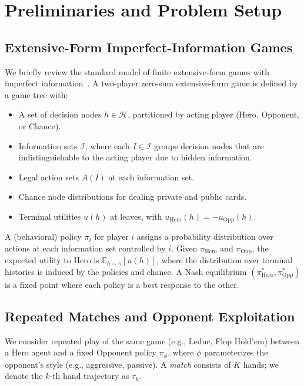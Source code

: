 \documentclass{article}
\begin{document}
\section{Preliminaries and Problem Setup}
\label{sec:prelim}

\subsection{Extensive-Form Imperfect-Information Games}

We briefly review the standard model of finite extensive-form games with imperfect information~\citep{neller2013cfrintro}. A two-player zero-sum extensive-form game is defined by a game tree with:
\begin{itemize}[leftmargin=*]
    \item A set of decision nodes $h \in \mathcal{H}$, partitioned by acting player (Hero, Opponent, or Chance).
    \item Information sets $\mathcal{I}$, where each $I \in \mathcal{I}$ groups decision nodes that are indistinguishable to the acting player due to hidden information.
    \item Legal action sets $A(I)$ at each information set.
    \item Chance node distributions for dealing private and public cards.
    \item Terminal utilities $u(h)$ at leaves, with $u_{\text{Hero}}(h) = - u_{\text{Opp}}(h)$.
\end{itemize}

A (behavioral) policy $\pi_i$ for player $i$ assigns a probability distribution over actions at each information set controlled by $i$. Given $\pi_{\text{Hero}}$ and $\pi_{\text{Opp}}$, the expected utility to Hero is $\mathbb{E}_{h \sim \pi}[u(h)]$, where the distribution over terminal histories is induced by the policies and chance. A Nash equilibrium $(\pi^*_{\text{Hero}}, \pi^*_{\text{Opp}})$ is a fixed point where each policy is a best response to the other.

\subsection{Repeated Matches and Opponent Exploitation}

We consider repeated play of the same game (e.g., Leduc, Flop Hold'em) between a Hero agent and a fixed Opponent policy $\pi_{\phi}$, where $\phi$ parameterizes the opponent's style (e.g., aggressive, passive). A \emph{match} consists of $K$ hands; we denote the $k$-th hand trajectory as $\tau_k$.
\end{document}
